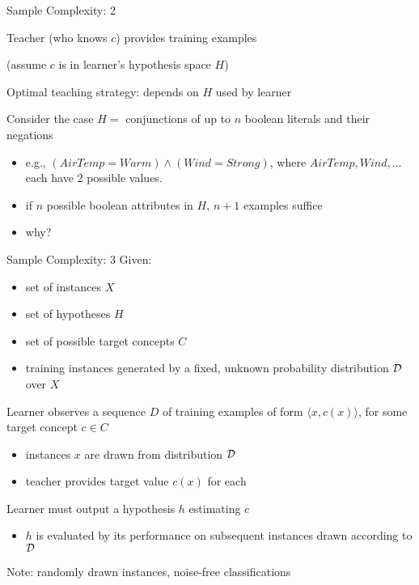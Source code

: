 \documentclass[%
pdf,
colorBG,
slideColor,
tcrico,
]{prosper}
\begin{document}
\begin{slide}{Sample Complexity: 2 }

Teacher (who knows $c$) provides training examples

(assume $c$ is in learner's hypothesis space $H$)


Optimal teaching strategy: depends on $H$ used by learner

Consider the case $H = $ conjunctions of up to $n$ boolean literals and their negations
\begin{itemize}
	\item[] e.g., $(AirTemp = Warm) \wedge (Wind = Strong)$, where $AirTemp, Wind,
	\ldots$ each have 2 possible values.
\end{itemize}
\begin{itemize} 
	\item if $n$ possible boolean attributes in $H$, $n + 1$ examples suffice
	\item why?
\end{itemize}
\end{slide}


\begin{slide}{Sample Complexity: 3 }
\tiny 
Given:
\begin{itemize}
\item set of instances $X$
\item set of hypotheses $H$
\item set of possible target concepts $C$
\item training instances generated by a fixed, unknown probability distribution $\cal{D}$ over $X$
\end{itemize}

Learner observes a sequence $D$ of training examples of form $\langle x, c(x) \rangle$, for some target concept $c \in C$
\begin{itemize}
\item instances $x$ are drawn from distribution $\cal{D}$
\item teacher provides target value $c(x)$ for each
\end{itemize}

Learner must output a hypothesis $h$ estimating $c$
\begin{itemize} 
\item $h$ is evaluated by its performance on subsequent instances drawn
according to $\cal{D}$
\end{itemize}

Note: randomly drawn instances, noise-free classifications
\end{slide}
\end{document}
